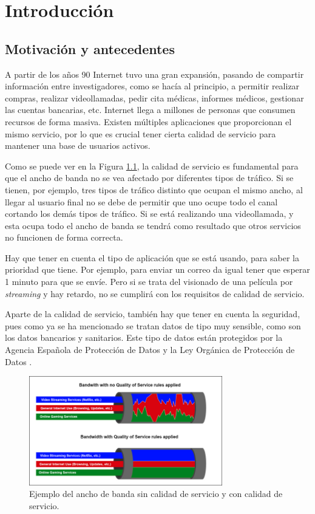 \chapter{Introducción}\label{introduccion}

\section{Motivación y antecedentes}

A partir de los años 90 Internet tuvo una gran expansión, pasando de compartir información entre investigadores, 
como se hacía al principio, a permitir realizar compras, realizar videollamadas, pedir cita médicas, informes médicos, gestionar 
las cuentas bancarias, etc. Internet llega a millones de personas que consumen recursos de forma masiva. 
Existen múltiples aplicaciones que proporcionan el mismo servicio, por lo que es crucial tener cierta calidad de servicio 
\cite{microqos} para mantener una base de usuarios activos.

\intro Como se puede ver en la Figura \ref{Figura 1}, la calidad de servicio es fundamental para que el ancho de banda no se vea 
afectado por diferentes tipos de tráfico. Si se tienen, por ejemplo, tres tipos de tráfico distinto que ocupan el mismo ancho, al 
llegar al usuario final no se debe de permitir que uno ocupe todo el canal cortando los demás tipos de tráfico. Si se está realizando 
una videollamada, y esta ocupa todo el ancho de banda se tendrá como resultado que otros servicios no funcionen de forma correcta.

\intro Hay que tener en cuenta el tipo de aplicación que se está usando, para saber la prioridad que tiene. Por ejemplo, para 
enviar un correo da igual tener que esperar 1 minuto para que se envíe. Pero si se trata del visionado de una película por 
\textit{streaming} y hay retardo, no se cumplirá con los requisitos de calidad de servicio.

\intro Aparte de la calidad de servicio, también hay que tener en cuenta la seguridad, pues como ya se ha mencionado 
se tratan datos de tipo muy sensible, como son los datos bancarios y sanitarios. Este tipo de datos están protegidos por la Agencia 
Española de Protección de Datos \cite{aepdindex} y la Ley Orgánica de Protección de Datos \cite{lopdindex}.

\begin{figure}[H]
  \includegraphics[width=0.75\textwidth]{imagenes/calidadservicio.png}
  \centering
  \caption{Ejemplo del ancho de banda sin calidad de servicio y con calidad de servicio.}\label{Figura 1}
\end{figure}

